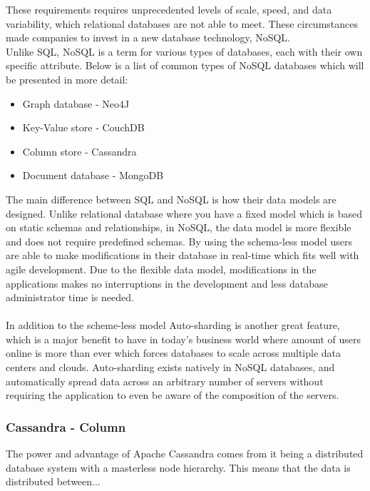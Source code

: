 These requirements requires unprecedented levels of scale, speed, and data variability, which relational databases are not able to meet. These circumstances made companies to invest in a new database technology, NoSQL.
\\[0.5cm]
Unlike SQL, NoSQL is a term for various types of databases, each with their own specific attribute. Below is a list of common types of NoSQL databases which will be presented in more detail:
\\
\begin{itemize}
  \item Graph database - Neo4J
  \item Key-Value store - CouchDB
  \item Column store - Cassandra
  \item Document database - MongoDB\\
\end{itemize}
The main difference between SQL and NoSQL is how their data models are designed. Unlike relational database where you have a fixed model which is based on static schemas and relationships, in NoSQL,  the data model is more flexible and does not require predefined schemas. By using the schema-less model users are able to make modifications in their database in real-time which fits well with agile development. Due to the flexible data model, modifications in the applications makes no interruptions in the development and less database administrator time is needed.\\\\
In addition to the scheme-less model Auto-sharding is another great feature, which is a major benefit to have in today’s business world where amount of users online is more than ever which forces databases to scale across multiple data centers and clouds. Auto-sharding exists natively in NoSQL databases, and automatically spread data across an arbitrary number of servers without requiring the application to even be aware of the composition of the servers.

\subsubsection{Cassandra - Column}
The power and advantage of Apache Cassandra comes from it being a distributed database system with a masterless node hierarchy. This means that the data is distributed between...    

